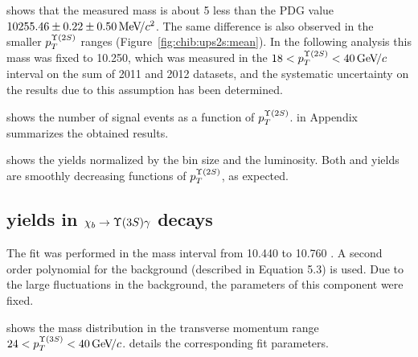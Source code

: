 


 shows that the measured \chiboneTwoP mass is
about 5 \mevcc less than the PDG value $10255.46  \pm 0.22 \pm 0.50 {\mathrm{\,Me\kern -0.1em V\!/}c^2}$.
The same difference is also observed in the smaller $p_T^{\Y2S}$ ranges
(Figure~\ref{fig:chib:ups2s:mean}).
In the following analysis this mass was fixed to 10.250\gevcc, which was measured
in the $18 < p_T^{\Y2S} < 40 \gevc$ interval on the sum of 2011 and 2012 datasets, and the
systematic uncertainty on the results due to this assumption has been
determined.



 shows the number of signal events as a function
of $p_T^{\Y2S}$.  in Appendix summarizes the
obtained results.



 shows the yields normalized by the bin
size and the luminosity. Both \chibTwoP and \chibThreeP yields are smoothly
decreasing functions of $p_T^{\Y2S}$, as expected.
\subsection{\texorpdfstring{\chib}{xb} yields in
    \texorpdfstring{$\chib \to \Y3S \gamma$}{xb --> Y(3S) gamma} decays}
\label{sec:chib:ups3s:fit}

The fit was performed in the mass interval from  10.440 to 10.760 \gevcc. 
A second order polynomial for the background (described in Equation 5.3) is used.
Due to the large fluctuations in the background, the
parameters of this component were fixed.


 shows the mass distribution in the
transverse momentum range $24<p_T^{\Y3S}<40\gevc$.
 details the corresponding fit parameters.





